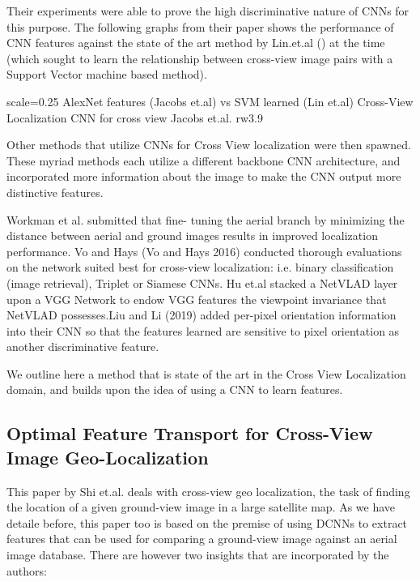 Their experiments were able to prove the high discriminative nature of CNNs for this purpose. The following graphs from their paper shows the performance of CNN features against the state of the art method by Lin.et.al (\textcite{Lin3}) at the time (which sought to learn the relationship between cross-view image pairs with a Support Vector machine based method).

{scale=0.25}%
{AlexNet features (Jacobs et.al) vs SVM learned (Lin et.al) Cross-View Localization}%
{CNN for cross view Jacobs et.al.}%
{rw3.9} %

Other methods that utilize CNNs for Cross View localization were then spawned. These myriad methods each utilize a different backbone CNN architecture, and incorporated more information about the image to make the CNN output more distinctive features.

Workman et al. submitted that fine- tuning the aerial branch by minimizing the distance between aerial and ground images results in improved localization performance.  Vo and Hays (Vo and Hays 2016) conducted thorough evaluations on the network suited best for cross-view localization: i.e. binary classification (image retrieval), Triplet or Siamese CNNs. Hu et.al stacked a NetVLAD layer upon a VGG Network to endow VGG features the viewpoint invariance that NetVLAD possesses.Liu and Li (2019) added per-pixel orientation information into their CNN so that the features learned are sensitive to pixel orientation as another discriminative feature. 

We outline here a method that is state of the art in the Cross View Localization domain, and builds upon the idea of using a CNN to learn features. 

\subsection{Optimal Feature Transport for Cross-View Image Geo-Localization}
This paper by Shi et.al. deals with cross-view geo localization, the task of finding the location of a given ground-view image in a large satellite map. As we have detaile before, this paper too is based on the premise of using DCNNs to extract features that can be used for comparing a ground-view image against an aerial image database. There are however two insights that are incorporated by the authors:

